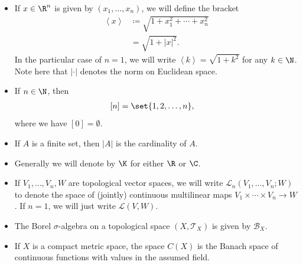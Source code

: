 \documentclass[10pt]{mypackage}
\renewcommand{\coloneq}{\coloneqq}
\begin{document}
\begin{itemize}
    We will write $ \mathcal{P}_{\operatorname{fin}}\left( X \right) $ to consist of all finite subsets subsets of $X$.
  \item If $x\in \R^{n}$ is given by $\left( x_1,\dots,x_n \right)$, we will define the bracket 
    \begin{align*}
      \left\langle x \right\rangle &\coloneq  \sqrt{1 + x_1^2 + \cdots + x_n^2}\\
                                   &= \sqrt{1 + \left\vert x \right\vert^2}.
    \end{align*}
    In the particular case of $n = 1$, we will write $ \left\langle k \right\rangle = \sqrt{1 + k^2} $ for any $k\in \N$. Note here that $\left\vert \cdot \right\vert$ denotes the norm on Euclidean space.
  \item If $n\in \N$, then
    \begin{align*}
      \left[ n \right] &= \set{1,2,\dots,n},
    \end{align*}
    where we have $\left[ 0 \right] = \emptyset$.
  \item If $A$ is a finite set, then $\left\vert A \right\vert$ is the cardinality of $A$. 
  \item Generally we will denote by $ \K $ for either $\R$ or $\C$.
  \item If $V_1,\dots,V_n,W$ are topological vector spaces, we will write $ \mathcal{L}_n\left( V_1,\dots,V_n;W \right) $ to denote the space of (jointly) continuous multilinear maps $V_1\times\cdots\times V_n\to W$. If $n = 1$, we will just write $\mathcal{L}\left( V,W \right)$.
  \item The Borel $\sigma$-algebra on a topological space $\left( X,\mathcal{T}_X \right)$ is given by $\mathcal{B}_X$.
  \item If $X$ is a compact metric space, the space $C\left( X \right)$ is the Banach space of continuous functions with values in the assumed field.
\end{itemize}
\end{document}
